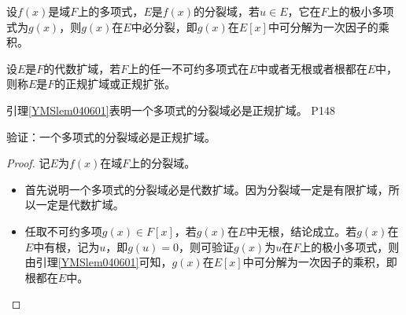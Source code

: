 \begin{lemma}\label{YMSlem040601}
	设$f(x)$是域$F$上的多项式，$E$是$f(x)$的分裂域，若$u\in E$，它在$F$上的极小多项式为$g(x)$，则$g(x)$在$E$中必分裂，即$g(x)$在$E[x]$中可分解为一次因子的乘积。
\end{lemma}


\begin{definition}
	设$E$是$F$的代数扩域，若$F$上的任一不可约多项式在$E$中或者无根或者根都在$E$中，则称$E$是$F$的正规扩域或正规扩张。
\end{definition}

\original
{
	引理\ref{YMSlem040601}表明一个多项式的分裂域必是正规扩域。
}
{P148}

\begin{proposition}
	验证：一个多项式的分裂域必是正规扩域。
\end{proposition}

\begin{proof}
	记$E$为$f(x)$在域$F$上的分裂域。
	\begin{itemize}
		\item 首先说明一个多项式的分裂域必是代数扩域。因为分裂域一定是有限扩域，所以一定是代数扩域。
		\item 任取不可约多项$g(x)\in F[x]$，若$g(x)$在$E$中无根，结论成立。若$g(x)$在$E$中有根，记为$u$，即$g(u)=0$，则可验证$g(x)$为$u$在$F$上的极小多项式，则由引理\ref{YMSlem040601}可知，$g(x)$在$E[x]$中可分解为一次因子的乘积，即根都在$E$中。
	\end{itemize}
\end{proof}






